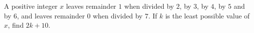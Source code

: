 A positive integer $x$ leaves remainder $1$ when divided by $2$, by $3$, by $4$, by $5$ and by $6$, and leaves remainder $0$ when divided by $7$. If $k$ is the least possible value of $x$, find $2k+10$.
